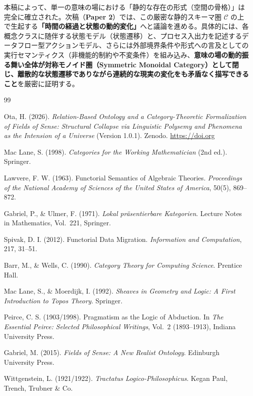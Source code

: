 \documentclass[11pt,a4paper]{ltjsarticle}
\theoremstyle{definition}
\theoremstyle{plain}
\theoremstyle{remark}
\begin{document}
本稿によって、単一の意味の場における「静的な存在の形式（空間の骨格）」は完全に確立された。次稿（\textbf{Paper 2}）では、この厳密な静的スキーマ圏 $\mathcal{C}$ の上で生起する\textbf{「時間の経過と状態の動的変化」}へと議論を進める。具体的には、各概念クラスに随伴する状態モデル（状態遷移）と、プロセス入出力を記述するデータフロー型アクションモデル、さらには外部境界条件や形式への言及としての実行セマンティクス（非機能的制約や不変条件）を組み込み、\textbf{意味の場の動的振る舞い全体が対称モノイド圏（Symmetric Monoidal Category）として閉じ、離散的な状態遷移でありながら連続的な現実の変化をも矛盾なく描写できること}を厳密に証明する。

\begin{thebibliography}{99}

Ota, H. (2026).
\emph{Relation-Based Ontology and a Category-Theoretic Formalization of Fields of Sense: Structural Collapse via Linguistic Polysemy and Phenomena as the Intension of a Universe} (Version 1.0.1).
Zenodo. \url{https://doi.org}

Mac Lane, S. (1998).
\emph{Categories for the Working Mathematician} (2nd ed.).
Springer.

Lawvere, F. W. (1963).
Functorial Semantics of Algebraic Theories.
\emph{Proceedings of the National Academy of Sciences of the United States of America}, 50(5), 869--872.

Gabriel, P., \& Ulmer, F. (1971).
\emph{Lokal pr\"asentierbare Kategorien}.
Lecture Notes in Mathematics, Vol.~221, Springer.

Spivak, D. I. (2012).
Functorial Data Migration.
\emph{Information and Computation}, 217, 31--51.

Barr, M., \& Wells, C. (1990).
\emph{Category Theory for Computing Science}.
Prentice Hall.

Mac Lane, S., \& Moerdijk, I. (1992).
\emph{Sheaves in Geometry and Logic: A First Introduction to Topos Theory}.
Springer.

Peirce, C. S. (1903/1998).
Pragmatism as the Logic of Abduction.
In \emph{The Essential Peirce: Selected Philosophical Writings}, Vol.~2 (1893--1913), Indiana University Press.

Gabriel, M. (2015).
\emph{Fields of Sense: A New Realist Ontology}.
Edinburgh University Press.

Wittgenstein, L. (1921/1922).
\emph{Tractatus Logico-Philosophicus}.
Kegan Paul, Trench, Trubner \& Co.


\end{thebibliography}
\end{document}
